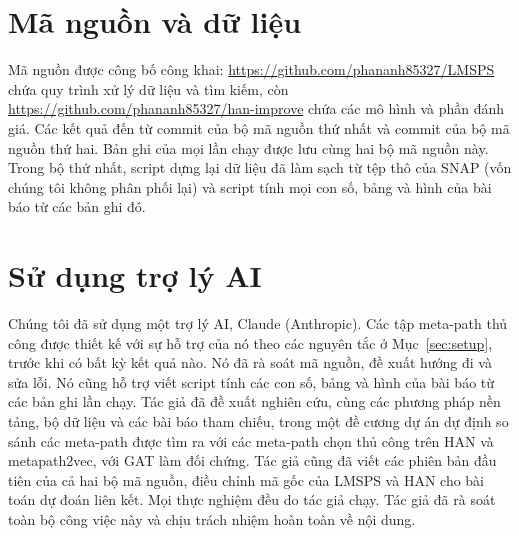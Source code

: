 \section*{Mã nguồn và dữ liệu}
Mã nguồn được công bố công khai: \url{https://github.com/phananh85327/LMSPS} chứa quy trình xử lý
dữ liệu và tìm kiếm, còn \url{https://github.com/phananh85327/han-improve} chứa các mô hình và phần
đánh giá. Các kết quả đến từ commit \texttt{} của bộ mã nguồn thứ nhất và
commit \texttt{} của bộ mã nguồn thứ hai. Bản ghi của mọi lần chạy được lưu cùng
hai bộ mã nguồn này. Trong bộ thứ nhất, script  dựng lại dữ liệu đã làm
sạch từ tệp thô của SNAP (vốn chúng tôi không phân phối lại) và script 
tính mọi con số, bảng và hình của bài báo từ các bản ghi đó.

\section*{Sử dụng trợ lý AI}
Chúng tôi đã sử dụng một trợ lý AI, Claude (Anthropic). Các tập meta-path thủ công được thiết kế với
sự hỗ trợ của nó theo các nguyên tắc ở Mục~\ref{sec:setup}, trước khi có bất kỳ kết quả nào. Nó đã
rà soát mã nguồn, đề xuất hướng đi và sửa lỗi. Nó cũng hỗ trợ viết script tính các con
số, bảng và hình của bài báo từ các bản ghi lần chạy. Tác giả đã đề xuất nghiên cứu,
cùng các phương pháp nền tảng, bộ dữ liệu và các bài báo tham chiếu, trong một đề cương dự án
dự định so sánh các meta-path được tìm ra với các meta-path chọn thủ công trên HAN và metapath2vec,
với GAT làm đối chứng. Tác giả cũng đã viết các phiên bản đầu tiên của cả hai bộ mã nguồn,
điều chỉnh mã gốc của LMSPS và HAN cho bài toán dự đoán liên kết. Mọi thực nghiệm đều do tác giả chạy.
Tác giả đã rà soát toàn bộ công việc này và chịu trách nhiệm hoàn toàn về nội dung.
